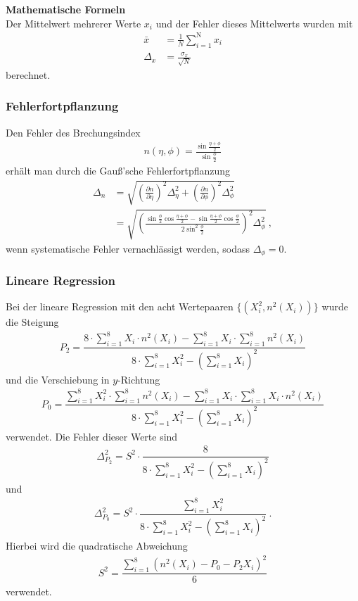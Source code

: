 \label{math:ErrorAver}
\label{math:ErrorBrechindex}
\label{math:QuadrAbw}
\label{math:Regression}
{\Large\bfseries Mathematische Formeln} \\
Der Mittelwert mehrerer Werte $x_i$ und der Fehler dieses Mittelwerts wurden mit
\begin{align*}
	\bar{x} &=  \frac{1}{N} \sum_{i=1}^\text{N} x_i \\
	\Delta_{x} &= \frac{\sigma_x}{\sqrt{N}}
\end{align*}
berechnet.
\subsubsection*{Fehlerfortpflanzung}
Den Fehler des Brechungsindex
\begin{align*}
	n(\eta,\phi) = \frac{\sin\frac{\eta+\phi}{2}}{\sin\frac{\phi}{2}}
\end{align*}
 erhält man durch die Gauß'sche Fehlerfortpflanzung
\begin{align*}
	\Delta_n &= \sqrt{\left( \frac{\partial n}{\partial \eta} \right)^2 \Delta_\eta^2 
		+ \left( \frac{\partial n}{\partial \phi} \right)^2 \Delta_\phi^2} \\
	&= \sqrt{\left(\frac{\sin\frac{\phi}{2}\cos\frac{\eta+\phi}{2}-\sin\frac{\eta+\phi}{2}\cos\frac{\phi}{2}}{2\sin^2\frac{\phi}{2}}\right)^2 \Delta_\phi^2} \ ,
\end{align*}
wenn systematische Fehler vernachlässigt werden, sodass $\Delta_\phi=0$.
\subsubsection*{Lineare Regression}
Bei der lineare Regression mit den acht Wertepaaren $\{ (X_i^2, n^2(X_i)) \}$ wurde die Steigung
\begin{align*}
	P_2 = \dfrac{8\cdot\sum\limits_{i=1}^8X_i\cdot n^2(X_i)-\sum\limits_{i=1}^8X_i\cdot\sum\limits_{i=1}^8n^2(X_i)}
	{8\cdot\sum\limits_{i=1}^8X_i^2-\left(\sum\limits_{i=1}^8X_i\right)^2}
\end{align*}
und die Verschiebung in $y$-Richtung
\begin{align*}
	P_0 = \dfrac{\sum\limits_{i=1}^8X_i^2\cdot\sum\limits_{i=1}^8n^2(X_i)-\sum\limits_{i=1}^8X_i\cdot\sum\limits_{i=1}^8X_i\cdot n^2(X_i)}
	 {8\cdot\sum\limits_{i=1}^8X_i^2-\left(\sum\limits_{i=1}^8X_i\right)^2}
\end{align*}
verwendet. Die Fehler dieser Werte sind
\begin{align*}
	\Delta_{P_2}^2 = S^2 \cdot\dfrac{8}{8\cdot\sum\limits_{i=1}^8X_i^2-\left(\sum\limits_{i=1}^8X_i\right)^2}
\end{align*}
und
\begin{align*}
	\Delta_{P_0}^2 = S^2 \cdot \dfrac{\sum\limits_{i=1}^8X_i^2}{8\cdot\sum\limits_{i=1}^8X_i^2-\left(\sum\limits_{i=1}^8X_i\right)^2} \ .
\end{align*}
Hierbei wird die quadratische Abweichung
\begin{align*}
	S^2 = \dfrac{\sum\limits_{i=1}^8\left(n^2(X_i)-P_0-P_2X_i\right)^2}{6}
\end{align*}
verwendet.\cite[Kap. 1.2.10]{Walcher}